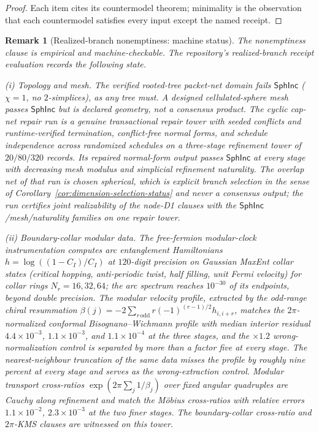 \documentclass[11pt]{article}
\newtheorem{remark}[theorem]{Remark}
\begin{document}
\begin{proof}
Each item cites its countermodel theorem; minimality is the observation that
each countermodel satisfies every input except the named receipt.
\end{proof}

\begin{remark}[Realized-branch nonemptiness: machine status]
\label{rem:realized-branch-status}
The nonemptiness clause is empirical and machine-checkable. The repository's
realized-branch receipt evaluation records
the following state.

(i) \emph{Topology and mesh.} The verified rooted-tree packet-net domain
fails \(\mathsf{SphInc}\) (\(\chi=1\), no \(2\)-simplices), as any tree
must. A designed cellulated-sphere mesh passes \(\mathsf{SphInc}\) but is
declared geometry, not a consensus product. The cyclic cap-net repair run
is a genuine
transactional repair tower with seeded conflicts and runtime-verified
termination, conflict-free normal forms, and schedule independence across
randomized schedules on a three-stage refinement tower of \(20/80/320\)
records. Its repaired normal-form output passes \(\mathsf{SphInc}\) at
every stage with decreasing mesh modulus and simplicial refinement
naturality. The overlap net of that run is chosen spherical, which is
explicit branch selection in the sense of
Corollary~\ref{cor:dimension-selection-status} and never a consensus
output; the run certifies joint realizability of the node-D1 clauses with
the \(\mathsf{SphInc}\)/mesh/naturality families on one repair tower.

(ii) \emph{Boundary-collar modular data.} The free-fermion modular-clock
instrumentation computes arc
entanglement Hamiltonians \(h=\log((1-C_I)/C_I)\) at \(120\)-digit
precision on Gaussian MaxEnt collar states (critical hopping,
anti-periodic twist, half filling, unit Fermi velocity) for collar rings
\(N_r=16,32,64\); the arc spectrum reaches \(10^{-30}\) of its endpoints,
beyond double precision. The modular velocity profile, extracted by the
odd-range chiral resummation
\(\beta(j)=-2\sum_{r\,\mathrm{odd}}r(-1)^{(r-1)/2}h_{i,i+r}\), matches the
\(2\pi\)-normalized conformal Bisognano--Wichmann profile with median
interior residual \(4.4\times10^{-3}\), \(1.1\times10^{-3}\), and
\(1.1\times10^{-4}\) at the three stages, and the \(\times1.2\)
wrong-normalization control is separated by more than a factor five at
every stage. The nearest-neighbour truncation of the same data misses the
profile by roughly nine percent at every stage and serves as the
wrong-extraction control. Modular transport cross-ratios
\(\exp(2\pi\sum_j1/\beta_j)\) over fixed angular quadruples are Cauchy
along refinement and match the M\"obius cross-ratios with relative errors
\(1.1\times10^{-2}\), \(2.3\times10^{-3}\) at the two finer stages. The
boundary-collar cross-ratio and \(2\pi\)-KMS clauses are witnessed on this
tower.


\end{remark}
\end{document}
